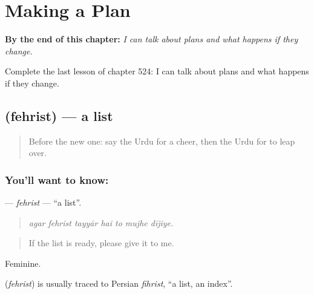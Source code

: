 
\chapter{Making a Plan}
\label{ch:ur-making-a-plan}

\begin{chapteropening}
\textbf{By the end of this chapter:} \emph{I can talk about plans and what happens if they change.}

Complete the last lesson of chapter 524: I can talk about plans and what happens if they change.
\end{chapteropening}

\section[\texorpdfstring{\ur{فہرست} (fehrist)}{فہرست (fehrist)}]{ (fehrist) — a list}

\label{lesson:UR-C524-fehrist}



\begin{quote}
Before the new one: say the Urdu for a cheer, then the Urdu for to leap over.
\end{quote}

\subsection*{You'll want to know: }
\textbf{} — \emph{fehrist} — \textquotedblleft{}a list\textquotedblright{}.

\begin{quote}
      
\end{quote}

\begin{quote}
\emph{agar fehrist tayyār hai to mujhe dījiye.}
\end{quote}

\begin{quote}
If the list is ready, please give it to me.
\end{quote}

Feminine.

\begin{cousinweb}
\textbf{} (\emph{fehrist}) is usually traced to Persian \emph{fihrist}, \textquotedblleft{}a list, an index\textquotedblright{}.
\end{cousinweb}

